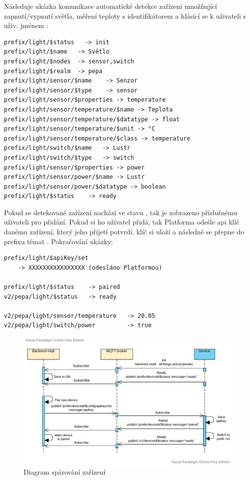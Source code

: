 Následuje ukázka komunikace automatické detekce zařízení umožňující zapnutí/vypnutí světla, měření teploty s identifikátorem  a hlásící se k uživateli s uživ. jménem :
\begin{verbatim}
prefix/light/$status   -> init
prefix/light/$name   -> Světlo
prefix/light/$nodes  -> sensor,switch
prefix/light/$realm  -> pepa
prefix/light/sensor/$name    -> Senzor
prefix/light/sensor/$type    -> sensor
prefix/light/sensor/$properties -> temperature
prefix/light/sensor/temperature/$name -> Teplota
prefix/light/sensor/temperature/$datatype -> float
prefix/light/sensor/temperature/$unit -> °C
prefix/light/sensor/temperature/$class -> temperature
prefix/light/switch/$name   -> Lustr
prefix/light/switch/$type   -> switch
prefix/light/sensor/$properties -> power
prefix/light/sensor/power/$name -> Lustr
prefix/light/sensor/power/$datatype -> boolean
prefix/light/$status    -> ready
\end{verbatim}

Pokud se detekované zařízení nachází ve stavu , tak je zobrazeno příslušnému uživateli pro přidání. Pokud si ho uživatel přidá, tak Platforma odešle api klíč danému zařízení, který jeho přijetí potvrdí, klíč si uloží a následně se přepne do prefixu témat . Pokračování ukázky:

\begin{verbatim}
prefix/light/$apiKey/set
    -> XXXXXXXXXXXXXXXX (odesláno Platformou)

prefix/light/$status    -> paired
v2/pepa/light/$status   -> ready

v2/pepa/light/sensor/temperature   -> 20.05
v2/pepa/light/switch/power         -> true
\end{verbatim}

\begin{figure}[htbp]
    \centering
    \includegraphics[width=\textwidth]{img/communication_part1.pdf}
    \caption{Diagram spárování zařízení}
\end{figure}

